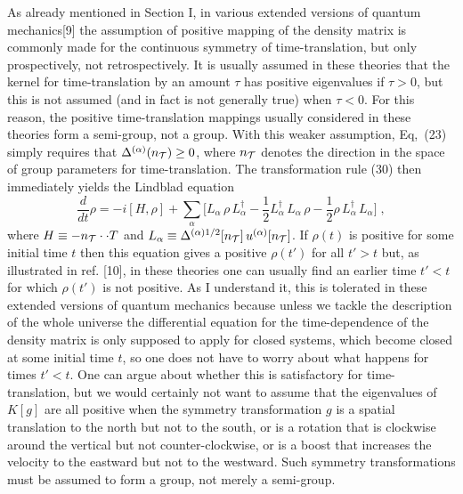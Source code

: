 As already mentioned in Section I,  in various extended versions of quantum mechanics[9] the assumption of positive mapping of the density matrix  is commonly made for the continuous symmetry of time-translation, but only prospectively, not retrospectively.  It is usually assumed in these theories that  the kernel  for time-translation by an amount $\tau$ has positive eigenvalues if $\tau>0$, but this is not assumed (and in fact is not generally true)  when $\tau<0$.  For this reason, the positive time-translation mappings usually considered in these theories form a  semi-group, not a group. 
With this weaker assumption, Eq,~(23) simply requires that $\Delta^{(\alpha)}(n_{\cal T})\geq 0$, where $n_{\cal T}$ denotes the direction in the space of  group parameters for time-translation.  The transformation rule (30) then immediately yields the Lindblad equation  
$$
\frac{d}{dt}\rho=-i[H,\rho]+\sum_\alpha\Bigg[L_\alpha\,\rho\, L_\alpha^\dagger-\frac{1}{2}L_\alpha^\dagger \,L_\alpha\,\rho-\frac{1}{2}\rho \,L_\alpha^\dagger\, L_\alpha\Bigg]\;,
$$
where $H\equiv -n_{\cal T}\cdot \cdot T$ and $L_\alpha\equiv \Delta^{(\alpha)1/2}[n_{\cal T}]\,u^{(\alpha)}[n_{\cal T}]$.
If $\rho(t)$ is positive for some initial time $t$ then this equation gives a positive $\rho(t')$ for all $t'>t$ but, as illustrated in  ref. [10], in these theories one can usually find an earlier time $t'<t$ for which $
\rho(t')$  is not positive.    As I understand it, this is tolerated in these extended versions of quantum mechanics because unless we tackle the description of the whole universe the differential equation for the time-dependence of the density matrix is only supposed to apply for closed systems, which become closed at some initial time $t$, so one does not have to worry about what happens for times $t'<t$.   
One can argue about whether this is satisfactory for time-translation, but we would certainly not want to assume that the eigenvalues of $K[g]$ are all positive when  the symmetry transformation $g$ is a spatial translation to the north but not to the south, or is a rotation that is clockwise around the vertical but not counter-clockwise, or is a boost that increases the velocity to the eastward but not to the westward.  Such symmetry transformations must be assumed to form a group, not merely a semi-group.  



